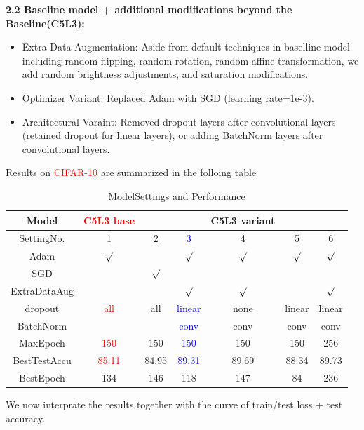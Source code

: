 \documentclass{article}
\begin{document}
\noindent\textbf{2.2 Baseline model + additional modifications beyond the Baseline(C5L3):}
\begin{itemize}
  \item Extra Data Augmentation: Aside from default techniques in baselline model including random flipping, random rotation, random affine transformation, we add random brightness adjustments, and saturation modifications.
  \item Optimizer Variant: Replaced Adam with SGD (learning rate=1e-3).
  \item Architectural Varaint: Removed dropout layers after convolutional layers (retained dropout for linear layers), or adding BatchNorm layers after convolutional layers.
\end{itemize}


\noindent Results on \textcolor{red}{CIFAR-10} are summarized in the folloing table

\begin{table}[htbp]
  \centering
  \caption{ModelSettings and Performance}
  \label{tab:model-compare}
  \begin{tabular}{|c|c|ccccc|} 
    \hline
    Model &\textcolor{red}{C5L3 base} &  &  & C5L3 variant & &   \\
    \hline
    SettingNo. &1 &2  &\textcolor{blue}{3}  & 4 &5 &6   \\
    \hline
    Adam &  \textcolor{red}{ $\surd$ }   &  & \textcolor{blue}{$\surd$} & $\surd$ & $\surd$  & $\surd$\\ 
    SGD & & $\surd$   & & &  &\\
    ExtraDataAug& &  & \textcolor{blue}{$\surd$} &  $\surd$ &  &$\surd$\\
    dropout &\textcolor{red}{all} & all   & \textcolor{blue}{linear}& none & linear  & linear \\ 
    BatchNorm & & & \textcolor{blue}{conv} & conv  & conv & conv \\ 
    MaxEpoch & \textcolor{red}{150} & 150 & \textcolor{blue}{150} & 150  & 150 & 256 \\
    \hline
    BestTestAccu & \textcolor{red}{85.11} &84.95 &\textcolor{blue}{89.31} & 89.69& 88.34 & 89.73 \\
    BestEpoch & 134 &146    &118 & 147 & 84  & 236\\
    \hline
  \end{tabular} 
\end{table}
\vspace{5mm}
\noindent We now interprate the results together with the curve of train/test loss + test accuracy.\\
\end{document}
